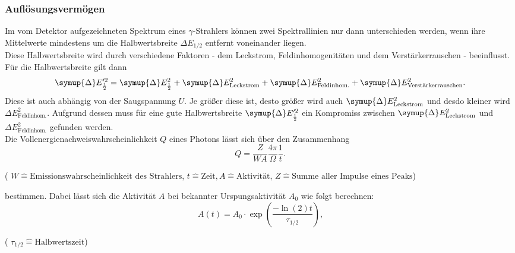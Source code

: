 \subsubsection{Auflösungsvermögen}
Im vom Detektor aufgezeichneten Spektrum eines $\gamma$-Strahlers können zwei Spektrallinien
nur dann unterschieden werden, wenn ihre Mittelwerte mindestens um die Halbwertsbreite
$\Delta E_{1/2}$ entfernt voneinander liegen. \\
Diese Halbwertsbreite wird durch verschiedene Faktoren - dem Leckstrom, Feldinhomogenitäten und dem Verstärkerrauschen - beeinflusst. Für die Halbwertsbreite gilt dann
\begin{equation}
    \symup{\Delta}E'^2_{\frac{1}{2}} = \symup{\Delta}E^2_{\frac{1}{2}} + \symup{\Delta}E^2_\text{Leckstrom} + \symup{\Delta}E^2_\text{Feldinhom.} + \symup{\Delta}E^2_\text{Verstärkerrauschen}.
\end{equation}
Diese ist auch abhängig von der Saugspannung $U$. Je größer diese ist, desto größer wird auch $\symup{\Delta}E^2_\text{Leckstrom}$ und desdo kleiner wird ${\Delta}E^2_\text{Feldinhom.}$. Aufgrund dessen muss für eine gute Halbwertsbreite $\symup{\Delta}E'^2_{\frac{1}{2}}$ ein Kompromiss zwischen $\symup{\Delta}E^2_\text{Leckstrom}$ und ${\Delta}E^2_\text{Feldinhom.}$ gefunden werden. \\
Die Vollenergienachweiswahrscheinlichkeit $Q$ eines Photons lässt sich über den Zusammenhang
\begin{equation}
Q=\frac{Z}{W A}\frac{4\pi}{\Omega}\frac{1}{t}\text{.}
\label{eqn:efficiency}
\end{equation}
\begin{center}
    \tiny{( $W \hat{=} \text{Emissionswahrscheinlichkeit des Strahlers} $, $t \hat{=} \text{Zeit}, A \hat{=} \text{Aktivität} $, $Z \hat{=} \text{Summe aller Impulse eines Peaks}$)}
\end{center}
bestimmen.
Dabei lässt sich die Aktivität $A$ bei bekannter Urspungsaktivität $A_0$ wie folgt berechnen:
\begin{equation}
A(t) = A_0\cdot \exp\left(\frac{-\ln(2)t}{\tau_{1/2}}\right)\text{,}\label{eqn:A}
\end{equation}
\begin{center}
    \tiny{( $\tau_{1/2} \hat{=} \text{Halbwertszeit}  $)}
\end{center}

